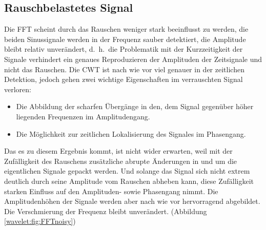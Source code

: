 \subsection{Rauschbelastetes Signal
	\label{wavelets:subsection:CWTvsFFTRauschbelastet}}
Die FFT scheint durch das Rauschen weniger stark beeinflusst zu
werden, die beiden Sinussignale werden in der Frequenz sauber
detektiert, die Amplitude bleibt relativ unverändert, d.~h.~die
Problematik mit der Kurzzeitigkeit der Signale verhindert ein genaues
Reproduzieren der Amplituden der Zeitsignale und nicht das Rauschen.
Die CWT ist nach wie vor viel genauer in der zeitlichen Detektion,
jedoch gehen zwei wichtige Eigenschaften im verrauschten Signal
verloren:
\begin{itemize}
	\item Die Abbildung der scharfen Übergänge in den, dem
	Signal gegenüber höher liegenden Frequenzen im Amplitudengang.
	\item Die Möglichkeit zur zeitlichen Lokalisierung des
	Signales im Phasengang.
\end{itemize}
Das es zu diesem Ergebnis kommt, ist nicht wider erwarten, weil mit
der Zufälligkeit des Rauschens zusätzliche abrupte Änderungen in
und um die eigentlichen Signale gepackt werden.
Und solange das Signal sich nicht extrem deutlich durch seine
Amplitude vom Rauschen abheben kann, diese Zufälligkeit starken
Einfluss auf den Amplituden- sowie Phasengang nimmt.
Die Amplitudenhöhen der Signale werden aber nach wie vor hervorragend
abgebildet.
Die Verschmierung der Frequenz bleibt unverändert.
(Abbildung \ref{wavelet:fig:FFTnoisy})

